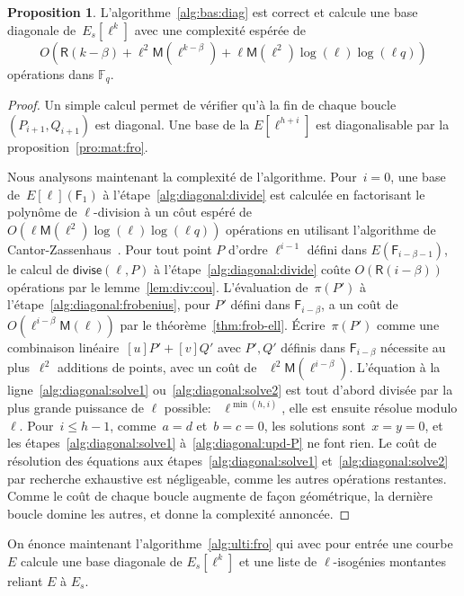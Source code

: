 \documentclass[10pt,a4paper]{book}
\theoremstyle{plain}
\theoremstyle{definition}
\theoremstyle{definition}
\theoremstyle{definition}
\theoremstyle{definition}
\newtheorem{prop}[thm]{Proposition}
\theoremstyle{definition}
\theoremstyle{remark}
\theoremstyle{remark}
\theoremstyle{definition}
\begin{document}
\begin{prop}\label{pro:alg:diagonal}
L'algorithme~\ref{alg:bas:diag} est correct et calcule une base diagonale 
de~$E_s[\ell^k]$ avec une complexité espérée de
\[
O(\mathsf{R}(k-\beta) + \ell^2\mathsf{M}(\ell^{k-\beta}) + \ell\mathsf{M}(\ell^2)\log(\ell)\log(\ell q))
\]
opérations dans $\mathbb{F}_q$.
\end{prop}

\begin{proof}
Un simple calcul permet de vérifier qu'à la fin de chaque boucle
$(P_{i+1},Q_{i+1})$ est diagonal. Une base de la $E[\ell^{h+i}]$ est 
diagonalisable par la proposition~\ref{pro:mat:fro}.

Nous analysons maintenant la complexité de l'algorithme.
Pour~$i = 0$, une base de~$E[\ell](\mathsf{F}_1)$ à l'étape~\ref{alg:diagonal:divide}
est calculée en factorisant le polynôme de $\ell$-division
à un côut espéré de $O(\ell\mathsf{M}(\ell^2)\log(\ell)\log(\ell q))$
opérations en utilisant l'algorithme de Cantor-Zassenhaus~\cite[Chapter 14.5]{vzGJG03}.
  Pour tout point $P$ d'ordre $\ell^{i-1}$ défini dans $E(\mathsf{F}_{i-\beta-1})$, 
  le calcul de $\mathsf{divise}(\ell, P)$ à l'étape~\ref{alg:diagonal:divide}
  coûte $O(\mathsf{R}(i-\beta))$ opérations par le lemme~\ref{lem:div:cou}.
  L'évaluation de~$\pi(P')$ à l'étape~\ref{alg:diagonal:frobenius}, pour $P'$ 
  défini dans $\mathsf{F}_{i-\beta}$, a un coût
  de~$O(\ell^{i-\beta}\mathsf{M}(\ell))$ par le théorème~\ref{thm:frob-ell}.
  \'Ecrire~$\pi(P')$ comme une combinaison linéaire~$[u] P' + [v] Q'$ avec 
  $P',Q'$ définis dans $\mathsf{F}_{i-\beta}$ nécessite au
  plus~$\ell^2$ additions de points, avec un coût de ~$\ell^2
  \mathsf{M}(\ell^{i-\beta})$.
L'équation à la ligne~\ref{alg:diagonal:solve1} ou~\ref{alg:diagonal:solve2}
est tout d'abord divisée par la plus grande puissance de $\ell$ possible:
~$\ell^{\min (h, i)}$, elle est ensuite résolue modulo $\ell$.
Pour~$i \leqslant h-1$, comme~$a = d$ et~$b = c = 0$, les solutions sont~$x = y
 = 0$, et les étapes~\ref{alg:diagonal:solve1} à~\ref{alg:diagonal:upd-P} ne 
font rien.
  Le coût de résolution des équations aux étapes~\ref{alg:diagonal:solve1}
  et~\ref{alg:diagonal:solve2} par recherche exhaustive est négligeable, comme
  les autres opérations restantes. Comme le coût de chaque boucle augmente
  de façon géométrique, la dernière boucle domine les autres, et donne la
  complexité annoncée.
\end{proof}

On énonce maintenant l'algorithme~\ref{alg:ulti:fro} qui avec pour entrée une 
courbe $E$ calcule une base diagonale de $E_s[\ell^k]$ et une liste de 
$\ell$-isogénies montantes reliant $E$ à $E_s$.
\end{document}
